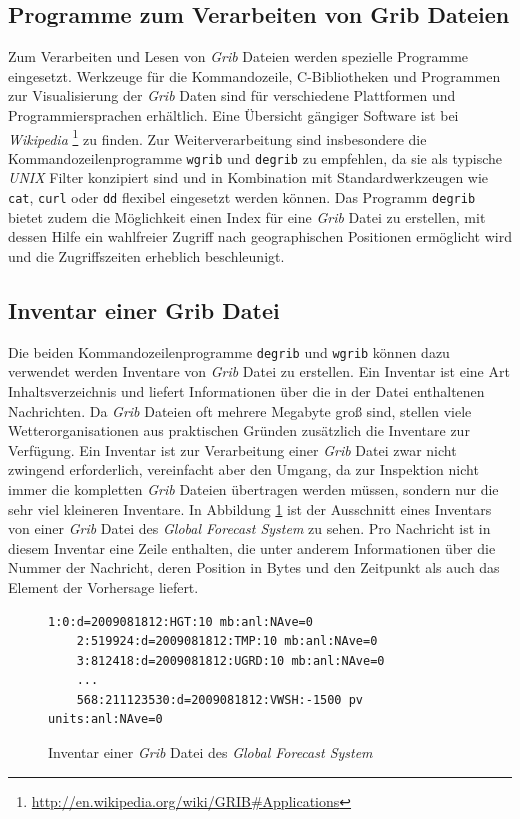 \subsection{Programme zum Verarbeiten von Grib Dateien}
\label{grib-reader}
Zum Verarbeiten und Lesen von \textit{Grib} Dateien werden spezielle
Programme eingesetzt. Werkzeuge für die Kommandozeile, C-Bibliotheken
und Programmen zur Visualisierung der \textit{Grib} Daten sind für
verschiedene Plattformen und Programmiersprachen erhältlich. Eine
Übersicht gängiger Software ist bei \textit{Wikipedia}
\footnote{\url{http://en.wikipedia.org/wiki/GRIB\#Applications}} zu
finden. Zur Weiterverarbeitung sind insbesondere die
Kommandozeilenprogramme \texttt{wgrib} und \texttt{degrib} zu
empfehlen, da sie als typische \textit{UNIX} Filter konzipiert sind
und in Kombination mit Standardwerkzeugen wie \texttt{cat},
\texttt{curl} oder \texttt{dd} flexibel eingesetzt werden können. Das
Programm \texttt{degrib} bietet zudem die Möglichkeit einen Index für
eine \textit{Grib} Datei zu erstellen, mit dessen Hilfe ein wahlfreier
Zugriff nach geographischen Positionen ermöglicht wird und die
Zugriffszeiten erheblich beschleunigt.

\subsection{Inventar einer Grib Datei}
Die beiden Kommandozeilenprogramme \texttt{degrib} und \texttt{wgrib}
können dazu verwendet werden Inventare von \textit{Grib} Datei zu
erstellen. Ein Inventar ist eine Art Inhaltsverzeichnis und liefert
Informationen über die in der Datei enthaltenen Nachrichten. Da
\textit{Grib} Dateien oft mehrere Megabyte groß sind, stellen viele
Wetterorganisationen aus praktischen Gründen zusätzlich die Inventare
zur Verfügung. Ein Inventar ist zur Verarbeitung einer \textit{Grib}
Datei zwar nicht zwingend erforderlich, vereinfacht aber den Umgang,
da zur Inspektion nicht immer die kompletten \textit{Grib} Dateien
übertragen werden müssen, sondern nur die sehr viel kleineren
Inventare. In Abbildung \ref{abbildung:inventar} ist der Ausschnitt
eines Inventars von einer \textit{Grib} Datei des \textit{Global
  Forecast System} zu sehen. Pro Nachricht ist in diesem Inventar eine
Zeile enthalten, die unter anderem Informationen über die Nummer der
Nachricht, deren Position in Bytes und den Zeitpunkt als auch das
Element der Vorhersage liefert.

\begin{figure}[h]
  \begin{Verbatim}[frame=lines,framerule=0.5pt,framesep=3mm]
    1:0:d=2009081812:HGT:10 mb:anl:NAve=0
    2:519924:d=2009081812:TMP:10 mb:anl:NAve=0
    3:812418:d=2009081812:UGRD:10 mb:anl:NAve=0
    ...
    568:211123530:d=2009081812:VWSH:-1500 pv units:anl:NAve=0
  \end{Verbatim}
  \caption{Inventar einer \textit{Grib} Datei des \textit{Global
      Forecast System} }
  \label{abbildung:inventar}
\end{figure}

